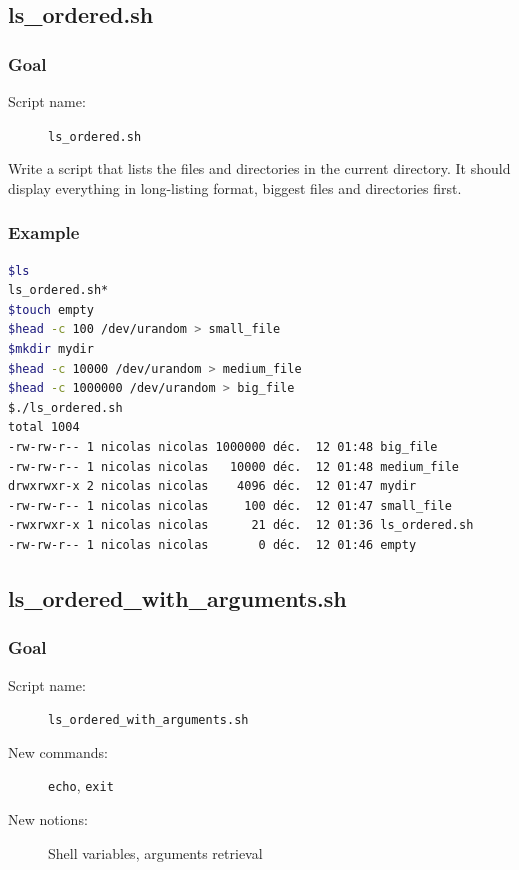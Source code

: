 \documentclass[12pt]{article}
\begin{document}
\subsection{ls\_ordered.sh}

\subsubsection{Goal}

\begin{description}
        \item[Script name:] \texttt{ls\_ordered.sh}
\end{description}

Write a script that lists the files and directories in the current directory. It should display everything in long-listing format, biggest files and directories first.

\subsubsection{Example}

\begin{lstlisting}[language=bash]
$ls
ls_ordered.sh*
$touch empty
$head -c 100 /dev/urandom > small_file
$mkdir mydir
$head -c 10000 /dev/urandom > medium_file
$head -c 1000000 /dev/urandom > big_file
$./ls_ordered.sh 
total 1004
-rw-rw-r-- 1 nicolas nicolas 1000000 déc.  12 01:48 big_file
-rw-rw-r-- 1 nicolas nicolas   10000 déc.  12 01:48 medium_file
drwxrwxr-x 2 nicolas nicolas    4096 déc.  12 01:47 mydir
-rw-rw-r-- 1 nicolas nicolas     100 déc.  12 01:47 small_file
-rwxrwxr-x 1 nicolas nicolas      21 déc.  12 01:36 ls_ordered.sh
-rw-rw-r-- 1 nicolas nicolas       0 déc.  12 01:46 empty
\end{lstlisting}

\subsection{ls\_ordered\_with\_arguments.sh}

\subsubsection{Goal}

\begin{description}
    \item[Script name:] \texttt{ls\_ordered\_with\_arguments.sh}
    \item[New commands:] \texttt{echo}, \texttt{exit}
    \item[New notions:] Shell variables, arguments retrieval

\end{description}
\end{document}
